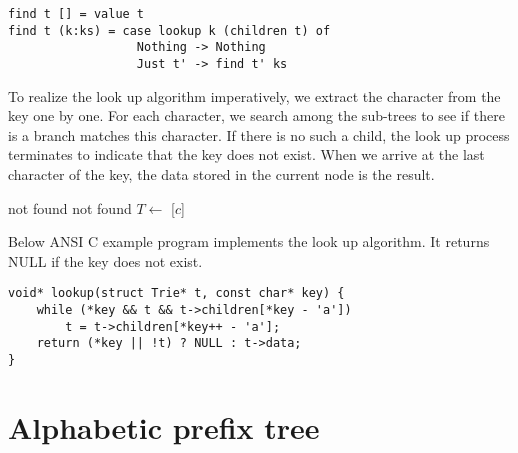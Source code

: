 \documentclass[b5paper]{article}
\begin{document}
\lstset{language=Haskell}
\begin{lstlisting}
find t [] = value t
find t (k:ks) = case lookup k (children t) of
                  Nothing -> Nothing
                  Just t' -> find t' ks
\end{lstlisting}

To realize the look up algorithm imperatively, we extract the character from the
key one by one. For each character, we search among the sub-trees
to see if there is a branch matches this character.
If there is no such a child, the look up process terminates
to indicate that the key does not exist.
When we arrive at the last character of the key,
the data stored in the current node is the result.

\begin{algorithmic}[1]
    \State \Return not found
  \EndIf
      \State \Return not found
    \EndIf
    \State $T \gets $ [$c$]
  \EndFor
  \State \Return {}
\EndFunction
\end{algorithmic}

Below ANSI C example program implements the look up algorithm.
It returns NULL if the key does not exist.

\lstset{language=C}
\begin{lstlisting}
void* lookup(struct Trie* t, const char* key) {
    while (*key && t && t->children[*key - 'a'])
        t = t->children[*key++ - 'a'];
    return (*key || !t) ? NULL : t->data;
}
\end{lstlisting}

\begin{Exercise}
\end{Exercise}

\section{Alphabetic prefix tree}
\end{document}
